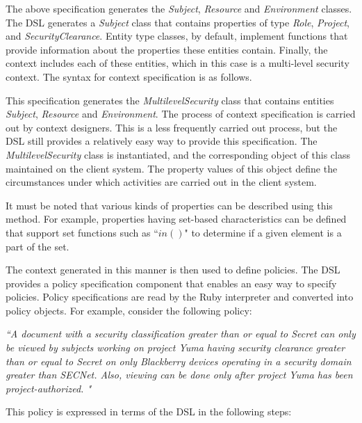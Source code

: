 

The above specification generates the {\em Subject}, {\em Resource} and {\em Environment} classes. The DSL generates a {\em Subject} class that contains properties of type {\em Role}, {\em Project}, and {\em SecurityClearance}. Entity type classes, by default, implement functions that provide information about the  properties these entities contain. Finally, the context includes each of these entities, which in this case is a multi-level security context. The syntax for context specification is as follows. 



This specification generates the {\em MultilevelSecurity} class that contains entities {\em Subject}, {\em Resource} and {\em Environment}. The process of context specification is carried out by context designers. This is a less frequently carried out process, but the DSL still provides a relatively easy way to provide this specification. The {\em MultilevelSecurity} class is instantiated, and the corresponding object of this class maintained on the client system. The property values of this object define the circumstances under which activities are carried out in the client system. 

It must be noted that various kinds of properties can be described using this method. For example, properties having set-based characteristics can be defined that support set functions such as ``$in()$" to determine if a given element is a part of the set. 

The context generated in this manner is then used to define policies. The DSL provides a policy specification component that enables an easy way to specify policies. Policy specifications are read by the Ruby interpreter and converted into policy objects. For example, consider the following policy: 

{\em ``A document with a security classification greater than or equal to Secret can only be viewed by subjects working on project Yuma having security clearance greater than or equal to Secret on only Blackberry devices operating in a security domain greater than SECNet. Also, viewing can be done only after project Yuma has been project-authorized. "}

This policy is expressed in terms of the DSL in the following steps: 



